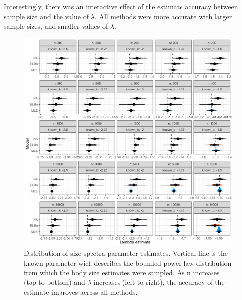 \documentclass[
]{article}
\begin{document}
Interestingly, there was an interactive effect of the estimate accuracy
between sample size and the value of \(\lambda\). All methods were more
accurate with larger sample sizes, and smaller values of \(\lambda\).

\begin{figure}
\centering
\includegraphics{figures/n_vary_est_b.png}
\caption{Distribution of size spectra parameter estimates. Vertical line
is the known parameter wich describes the bounded power law distribution
from which the body size estimates were sampled. As n increases (top to
bottom) and \(\lambda\) increases (left to right), the accuracy of the
estimate improves across all methods.}
\end{figure}
\end{document}
